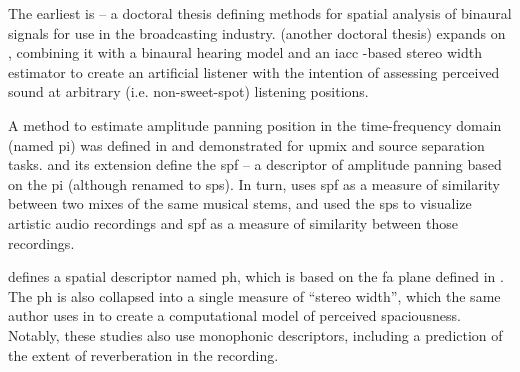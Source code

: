 \documentclass[referee,pdflatex,sn-mathphys-num]{sn-jnl}%
\newcommand{\q}[1]{\enquote{#1}}
\begin{document}
The earliest is \cite{supperOnsetGuidedSpatialAnalyser2005} -- a doctoral thesis defining methods for spatial analysis of binaural signals for use in the broadcasting industry. \cite{dewhirstModellingPerceivedSpatial2008} (another doctoral thesis) expands on \cite{supperOnsetGuidedSpatialAnalyser2005}, combining it with a binaural hearing model and an \gls{iacc} -based stereo width estimator \cite{masonImplementationApplicationBinaural2006} to create an artificial listener with the intention of assessing perceived sound at arbitrary (i.e. non-sweet-spot) listening positions.

A method to estimate amplitude panning position in the time-frequency domain (named \gls{pi}) was defined in \cite{avendanoFrequencyDomainTechniques2002,avendanoFrequencydomainSourceIdentification2003} and demonstrated for upmix and source separation tasks. \cite{tzanetakisStereoPanningFeatures2007} and its  extension \cite{tzanetakisStereoPanningInformation2010} define the \gls{spf} -- a descriptor of amplitude panning based on the \gls{pi} (although renamed to \gls{sps}). In turn, \cite{colonelReverseEngineeringRecording2021} uses \gls{spf} as a measure of similarity between two mixes of the same musical stems, and \cite{dalemanarangoArchivingSonicEphemeral2021} used the \gls{sps} to visualize artistic audio recordings and \gls{spf} as a measure of similarity between those recordings.

\cite{sarroffMeasurementsSpaciousnessStereophonic2008} defines a spatial descriptor named \gls{ph}, which is based on the \gls{fa} plane defined in \cite{barrySoundSourceSeparation2004}. The \gls{ph} is also collapsed into a single measure of \q{stereo width}, which the same author uses in \cite{sarroffPredictingPerceivedSpaciousness2009,sarroffComputationalModelPerceived2011} to create a computational model of perceived spaciousness. Notably, these studies also use monophonic descriptors, including a prediction of the extent of reverberation in the recording.
\end{document}
